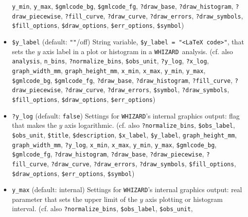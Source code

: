 \documentclass[12pt]{book}
\newcommand{\ttt}[1]{\texttt{#1}}
\newcommand{\whizard}{\texttt{WHIZARD}}
\begin{document}
\begin{itemize}
\ttt{y\_min}, \ttt{y\_max}, \ttt{\$gmlcode\_bg}, \ttt{\$gmlcode\_fg},
\ttt{?draw\_base}, \newline \ttt{?draw\_histogram}, \ttt{?draw\_piecewise},
\ttt{?fill\_curve}, \ttt{?draw\_curve}, \ttt{?draw\_errors},
\newline \ttt{?draw\_symbols}, \ttt{\$fill\_options}, \ttt{\$draw\_options},
\ttt{\$err\_options}, \ttt{\$symbol})
\item
\ttt{\$y\_label} \qquad (default: \ttt{""}/off) \newline
String variable, \ttt{\$y\_label = "<LaTeX code>"}, that sets the $y$
axis label in a plot or histogram in a \whizard\ analysis. 
(cf. also \ttt{analysis}, 
\ttt{n\_bins}, \ttt{?normalize\_bins}, \ttt{\$obs\_unit},
\ttt{?y\_log}, \ttt{?x\_log},
\ttt{graph\_width\_mm}, \ttt{graph\_height\_mm}, 
\ttt{x\_min}, \ttt{x\_max}, \ttt{y\_min}, \ttt{y\_max},
\newline \ttt{\$gmlcode\_bg}, \ttt{\$gmlcode\_fg}, \ttt{?draw\_base},
\ttt{?draw\_histogram}, \ttt{?fill\_curve}, \newline \ttt{?draw\_piecewise}, 
\ttt{?draw\_curve}, \ttt{?draw\_errors}, \ttt{\$symbol}, 
\ttt{?draw\_symbols}, \newline \ttt{\$fill\_options}, \ttt{\$draw\_options},
\ttt{\$err\_options})
\item
\ttt{?y\_log} \qquad (default: \ttt{false}) \newline
Settings for \whizard's internal graphics output: flag that
makes the $y$ axis logarithmic. (cf. also
\ttt{?normalize\_bins}, \ttt{\$obs\_label}, \ttt{\$obs\_unit},
\ttt{\$title}, \ttt{\$description}, \ttt{\$x\_label},
\ttt{\$y\_label}, \ttt{graph\_height\_mm}, \ttt{graph\_width\_mm}, 
\ttt{?y\_log}, \ttt{x\_min}, \ttt{x\_max},
\ttt{y\_min}, \ttt{y\_max}, \newline \ttt{\$gmlcode\_bg}, \ttt{\$gmlcode\_fg},
\ttt{?draw\_histogram}, \ttt{?draw\_base}, \ttt{?draw\_piecewise},
\newline \ttt{?fill\_curve}, \ttt{?draw\_curve}, \ttt{?draw\_errors},
\ttt{?draw\_symbols}, \ttt{\$fill\_options}, \newline \ttt{\$draw\_options},
\ttt{\$err\_options}, \ttt{\$symbol})
\item
\ttt{y\_max} \qquad (default: internal) \newline
Settings for \whizard's internal graphics output: real parameter that
sets the upper limit of the $y$ axis plotting or histogram interval. (cf. also
\ttt{?normalize\_bins}, \ttt{\$obs\_label}, \ttt{\$obs\_unit},

\end{itemize}
\end{document}
